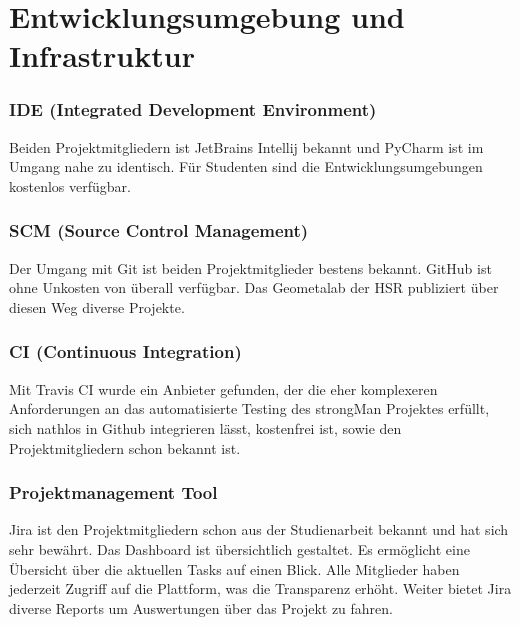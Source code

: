 \section{Entwicklungsumgebung und Infrastruktur}
\subsubsection{IDE (Integrated Development Environment)}
Beiden Projektmitgliedern ist JetBrains Intellij bekannt und \Gls{PyCharm} ist im Umgang nahe zu identisch.
Für Studenten sind die Entwicklungsumgebungen kostenlos verfügbar.
\subsubsection{SCM (Source Control Management)}
Der Umgang mit \Gls{Git} ist beiden Projektmitglieder bestens bekannt.
\Gls{GitHub} ist ohne Unkosten von überall verfügbar.
Das Geometalab der HSR publiziert über diesen Weg diverse Projekte.

\subsubsection{CI (Continuous Integration)}
Mit \Gls{Travis CI} wurde ein Anbieter gefunden, der die eher komplexeren Anforderungen an das automatisierte Testing des strongMan Projektes erfüllt, sich nathlos in Github integrieren lässt, kostenfrei ist, sowie den Projektmitgliedern schon bekannt ist.

\subsubsection{Projektmanagement Tool}
\Gls{Jira} ist den Projektmitgliedern schon aus der Studienarbeit bekannt und hat sich sehr bewährt.
Das Dashboard ist übersichtlich gestaltet. Es ermöglicht eine Übersicht über die aktuellen Tasks auf einen Blick.
Alle Mitglieder haben jederzeit Zugriff auf die Plattform, was die Transparenz erhöht.
Weiter bietet Jira diverse Reports um Auswertungen über das Projekt zu fahren.
